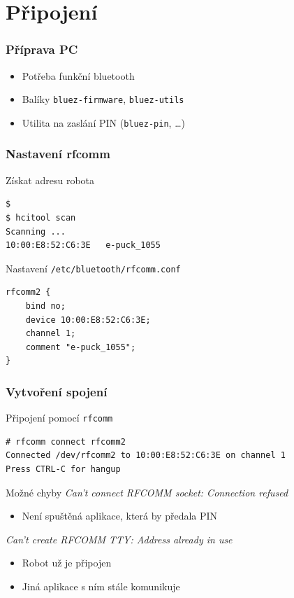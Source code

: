\documentclass{beamer}
\begin{document}
\section{Připojení}

\begin{frame}
    \frametitle{Příprava PC}
    \begin{itemize}
        \item Potřeba funkční bluetooth
        \item Balíky {\tt bluez-firmware}, {\tt bluez-utils}
        \item Utilita na zaslání PIN ({\tt bluez-pin}, \ldots)
    \end{itemize}
\end{frame}

\begin{frame}[fragile]
    \frametitle{Nastavení rfcomm}
    \begin{block}{Získat adresu robota}
    \begin{verbatim}
$
$ hcitool scan
Scanning ...
10:00:E8:52:C6:3E	e-puck_1055
    \end{verbatim}
    \end{block}

    \begin{block}{Nastavení {\tt /etc/bluetooth/rfcomm.conf}}
    \begin{verbatim}
rfcomm2 {
    bind no;
    device 10:00:E8:52:C6:3E;
    channel 1;
    comment "e-puck_1055";
}
    \end{verbatim}
    \end{block}
\end{frame}

\begin{frame}[fragile]
    \frametitle{Vytvoření spojení}

    \begin{block}{Připojení pomocí {\tt rfcomm}}
    \begin{verbatim}
# rfcomm connect rfcomm2
Connected /dev/rfcomm2 to 10:00:E8:52:C6:3E on channel 1
Press CTRL-C for hangup
    \end{verbatim}
    \end{block}

    \begin{alertblock}{Možné chyby}
        {\em Can’t connect RFCOMM socket: Connection refused}
        \begin{itemize}
            \item Není spuštěná aplikace, která by předala PIN
        \end{itemize}
        {\em Can’t create RFCOMM TTY: Address already in use}
        \begin{itemize}
            \item Robot už je připojen
            \item Jiná aplikace s ním stále komunikuje
        \end{itemize}
    \end{alertblock}
\end{frame}
\end{document}

